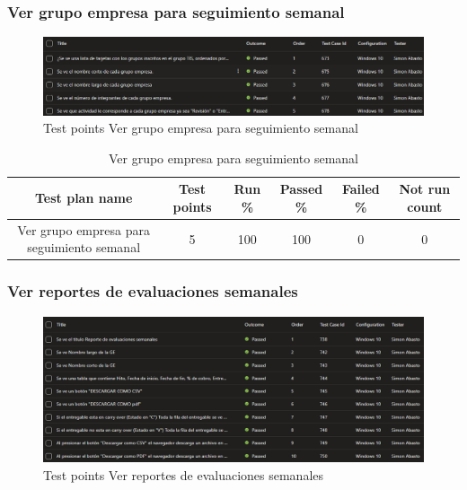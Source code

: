 \documentclass[12pt,letterpaper]{article}
\begin{document}



\subsubsection{Ver grupo empresa para seguimiento semanal}
\begin{figure}[H]
        \centering
        \includegraphics[width=1\linewidth]{Ver grupo empresa para seguimiento semanal.png}
        \caption{Test points Ver grupo empresa para seguimiento semanal}
    \end{figure}

 \begin{table}[h] %
    \centering %
    \caption{Ver grupo empresa para seguimiento semanal} %
    \begin{tabular}{|c|c|c|c|c|c|}
        \rowcolor{green} %
        \hline
        Test plan name & Test points & Run \% & Passed \% & Failed \% & Not run count \\
        \hline
   Ver grupo empresa para seguimiento semanal& 5 & 100 & 100 & 0 & 0 \\
        \hline
    \end{tabular}
\end{table}




\subsubsection{Ver reportes de evaluaciones semanales}
\begin{figure}[H]
        \centering
        \includegraphics[width=1\linewidth]{Ver reportes de evaluaciones semanales.png}
        \caption{Test points Ver reportes de evaluaciones semanales}
    \end{figure}
\end{document}

